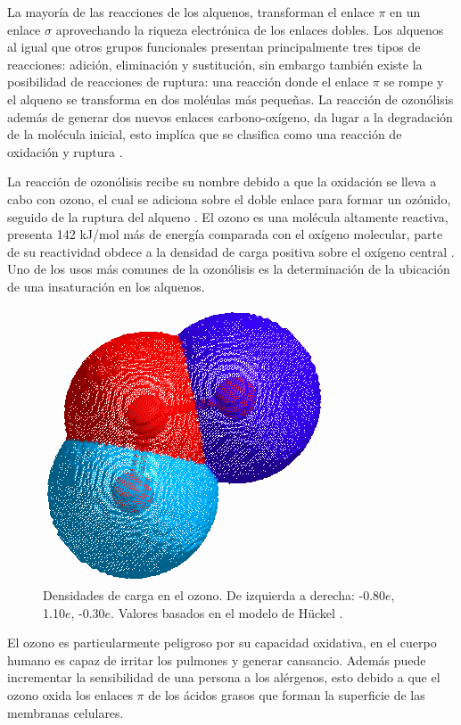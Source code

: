 \documentclass[fleqn,11pt]{SelfArx}
\begin{document}
La mayor\'ia de las reacciones de los alquenos, transforman el enlace $\pi$ en un enlace $\sigma$ aprovechando la riqueza electr\'onica de los enlaces dobles. Los alquenos al igual que otros grupos funcionales presentan principalmente tres tipos de reacciones: adici\'on, eliminaci\'on y sustituci\'on, sin embargo tambi\'en existe la posibilidad de reacciones de ruptura: una reacci\'on donde el enlace $\pi$ se rompe y el alqueno se transforma en dos mol\'eulas m\'as peque\~nas. La reacci\'on de ozon\'olisis adem\'as de generar dos nuevos enlaces carbono-ox\'igeno, da lugar a la degradaci\'on de la mol\'ecula inicial, esto impl\'ica que se clasifica como una reacci\'on de oxidaci\'on y ruptura \cite{Wade2013, Morrison2002}.


La reacci\'on de ozon\'olisis recibe su nombre debido a que la oxidaci\'on se lleva a cabo con ozono, el cual se adiciona sobre el doble enlace para formar un oz\'onido, seguido de la ruptura del alqueno \cite{Morrison2002}. El ozono es una mol\'ecula altamente reactiva, presenta 142 kJ/mol m\'as de energ\'ia comparada con el ox\'igeno molecular, parte de su reactividad obdece a la densidad de carga positiva sobre el ox\'igeno central \cite{Wade2013}. Uno de los usos m\'as comunes de la ozon\'olisis es la determinaci\'on de la ubicaci\'on de una insaturaci\'on en los alquenos.
\begin{figure}[h]
	\centering
	\includegraphics[width=0.4\linewidth]{structures/ozone.png}
	\caption{Densidades de carga en el ozono. De izquierda a derecha: -0.80$e$, 1.10$e$, -0.30$e$. Valores basados en el modelo de H\"uckel \cite{PerkinElmer}.}
\end{figure}
\pagebreak

El ozono es particularmente peligroso por su capacidad oxidativa, en el cuerpo humano es capaz de irritar los pulmones y generar cansancio. Adem\'as puede incrementar la sensibilidad de una persona a los al\'ergenos, esto debido a que el ozono oxida los enlaces $\pi$ de los \'acidos grasos que forman la superficie de las membranas celulares\cite{Wade2013}.
\end{document}

